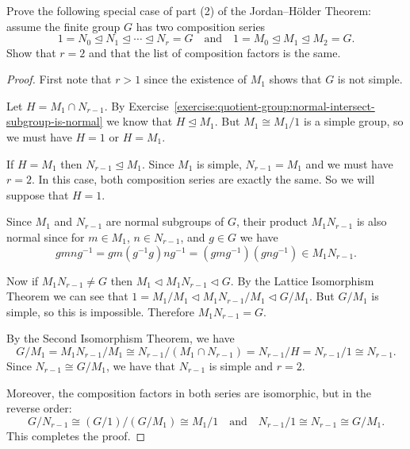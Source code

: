 \label{exercise:quotient-group:jordan-holder-2-special-case}
Prove the following special case of part (2) of the Jordan--H\"older
Theorem: assume the finite group $G$ has two composition series
\begin{equation*}
  1 = N_0 \trianglelefteq N_1 \trianglelefteq\cdots\trianglelefteq
  N_r = G \quad\text{and}\quad
  1 = M_0\trianglelefteq M_1\trianglelefteq M_2 = G.
\end{equation*}
Show that $r = 2$ and that the list of composition factors is the
same.
\begin{proof}
  First note that $r > 1$ since the existence of $M_1$ shows that $G$
  is not simple.

  Let $H = M_1\cap N_{r-1}$. By
  Exercise~\ref{exercise:quotient-group:normal-intersect-subgroup-is-normal}
  we know that $H\trianglelefteq M_1$. But $M_1\cong M_1/1$ is a simple
  group, so we must have $H = 1$ or $H = M_1$.

  If $H = M_1$ then $N_{r-1}\trianglelefteq M_1$. Since $M_1$ is
  simple, $N_{r-1} = M_1$ and we must have $r = 2$. In this case, both
  composition series are exactly the same. So we will suppose that
  $H = 1$.

  Since $M_1$ and $N_{r-1}$ are normal subgroups of $G$, their product
  $M_1N_{r-1}$ is also normal since for $m\in M_1$, $n\in N_{r-1}$,
  and $g\in G$ we have
  \begin{equation*}
    gmng^{-1} = gm(g^{-1}g)ng^{-1} = (gmg^{-1})(gng^{-1}) \in M_1N_{r-1}.
  \end{equation*}

  Now if $M_1N_{r-1}\neq G$ then
  $M_1\triangleleft M_1N_{r-1}\triangleleft G$. By the Lattice
  Isomorphism Theorem we can see that
  $1 = M_1/M_1 \triangleleft M_1N_{r-1}/M_1 \triangleleft G/M_1$. But
  $G/M_1$ is simple, so this is impossible. Therefore
  $M_1N_{r-1} = G$.

  By the Second Isomorphism Theorem, we have
  \begin{equation*}
    G/M_1 = M_1N_{r-1}/M_1 \cong N_{r-1}/(M_1\cap N_{r-1})
    = N_{r-1}/H = N_{r-1}/1 \cong N_{r-1}.
  \end{equation*}
  Since $N_{r-1}\cong G/M_1$, we have that $N_{r-1}$ is simple and
  $r = 2$.

  Moreover, the composition factors in both series are isomorphic, but
  in the reverse order:
  \begin{equation*}
    G/N_{r-1} \cong (G/1)/(G/M_1) \cong M_1/1
    \quad\text{and}\quad
    N_{r-1}/1 \cong N_{r-1} \cong G/M_1.
  \end{equation*}
  This completes the proof.
\end{proof}

